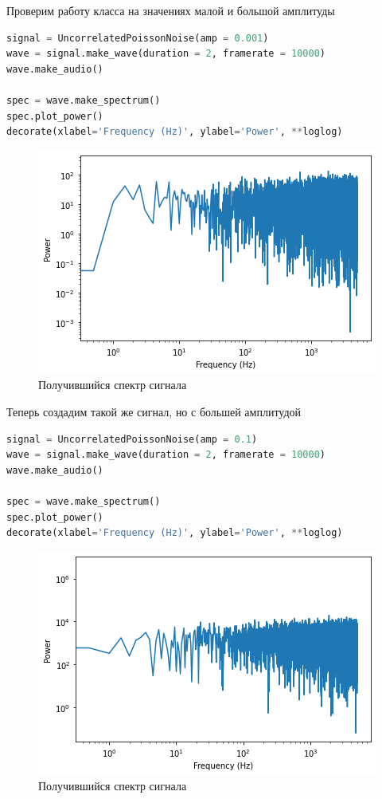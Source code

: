 Проверим работу класса на значениях малой и большой амплитуды

\begin{lstlisting}[language=Python]
signal = UncorrelatedPoissonNoise(amp = 0.001)
wave = signal.make_wave(duration = 2, framerate = 10000)
wave.make_audio()

spec = wave.make_spectrum()
spec.plot_power()
decorate(xlabel='Frequency (Hz)', ylabel='Power', **loglog)
\end{lstlisting}

\begin{figure}[H]
	\begin{center}
		\includegraphics[scale=1]{fig/lab04/lab04_10.png}
		\caption{Получившийся спектр сигнала}
	\end{center}
\end{figure}

Теперь создадим такой же сигнал, но с большей амплитудой

\begin{lstlisting}[language=Python]
signal = UncorrelatedPoissonNoise(amp = 0.1)
wave = signal.make_wave(duration = 2, framerate = 10000)
wave.make_audio()

spec = wave.make_spectrum()
spec.plot_power()
decorate(xlabel='Frequency (Hz)', ylabel='Power', **loglog)
\end{lstlisting}

\begin{figure}[H]
	\begin{center}
		\includegraphics[scale=1]{fig/lab04/lab04_11.png}
		\caption{Получившийся спектр сигнала}
	\end{center}
\end{figure}

